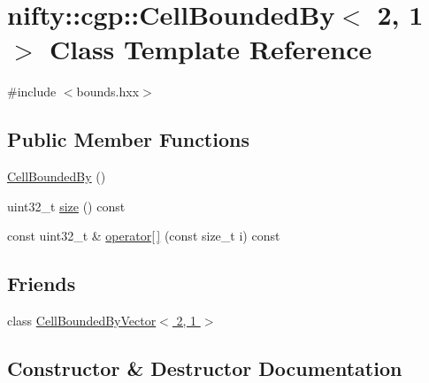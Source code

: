 \hypertarget{classnifty_1_1cgp_1_1CellBoundedBy_3_012_00_011_01_4}{}\section{nifty\+:\+:cgp\+:\+:Cell\+Bounded\+By$<$ 2, 1 $>$ Class Template Reference}
\label{classnifty_1_1cgp_1_1CellBoundedBy_3_012_00_011_01_4}


{\ttfamily \#include $<$bounds.\+hxx$>$}

\subsection*{Public Member Functions}
\begin{DoxyCompactItemize}
\item 
\hyperlink{classnifty_1_1cgp_1_1CellBoundedBy_3_012_00_011_01_4_ad22d7f083d1f1ac4b379d19281b63986}{Cell\+Bounded\+By} ()
\item 
uint32\+\_\+t \hyperlink{classnifty_1_1cgp_1_1CellBoundedBy_3_012_00_011_01_4_a4f4b57ee7dd61e28ea8a937a55d03def}{size} () const
\item 
const uint32\+\_\+t \& \hyperlink{classnifty_1_1cgp_1_1CellBoundedBy_3_012_00_011_01_4_ad2f6cdd4927b4f2f635842258d12b6b3}{operator\mbox{[}$\,$\mbox{]}} (const size\+\_\+t i) const
\end{DoxyCompactItemize}
\subsection*{Friends}
\begin{DoxyCompactItemize}
\item 
class \hyperlink{classnifty_1_1cgp_1_1CellBoundedBy_3_012_00_011_01_4_abdb37afb9b659d234727be05e2560e42}{Cell\+Bounded\+By\+Vector$<$ 2, 1 $>$}
\end{DoxyCompactItemize}


\subsection{Constructor \& Destructor Documentation}
\mbox{\label{classnifty_1_1cgp_1_1CellBoundedBy_3_012_00_011_01_4_ad22d7f083d1f1ac4b379d19281b63986}} 
